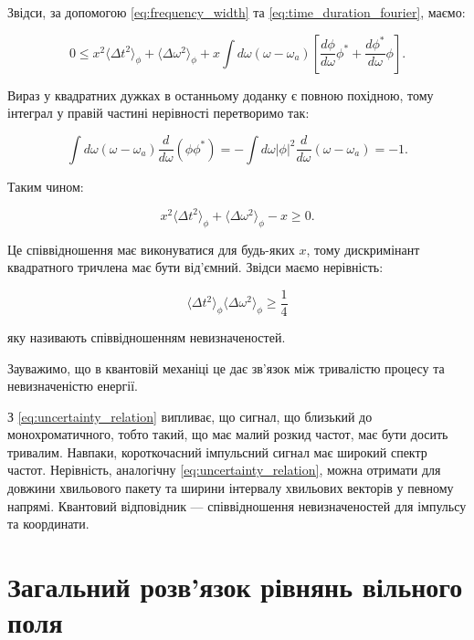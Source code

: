 Звідси, за допомогою \eqref{eq:frequency_width} та \eqref{eq:time_duration_fourier}, маємо:

\begin{equation*}
0 \leq x^2 \langle \Delta t^2 \rangle_{\phi} + \langle \Delta \omega^2 \rangle_{\phi} + x \int d\omega (\omega - \omega_a) \left[ \frac{d\phi}{d\omega}
\phi^{*} + \frac{d\phi^{*}}{d\omega} \phi \right].
\end{equation*}

Вираз у квадратних дужках в останньому доданку є повною похідною, тому інтеграл у правій частині нерівності перетворимо так:

\begin{equation*}
\int d\omega (\omega - \omega_a) \frac{d}{d\omega} (\phi \phi^{*}) = -\int d\omega |\phi|^2 \frac{d}{d\omega} (\omega - \omega_a) = -1.
\end{equation*}

Таким чином:

\begin{equation*}
x^2 \langle \Delta t^2 \rangle_{\phi} + \langle \Delta \omega^2 \rangle_{\phi} - x \geq 0.
\end{equation*}

Це співвідношення має виконуватися для будь-яких \( x \), тому дискримінант квадратного тричлена має бути від’ємний. Звідси маємо нерівність:

\begin{equation}
\langle \Delta t^2 \rangle_{\phi} \langle \Delta \omega^2 \rangle_{\phi} \geq \frac{1}{4}
\label{eq:uncertainty_relation}
\end{equation}

яку називають співвідношенням невизначеностей.

Зауважимо, що в квантовій механіці це дає зв’язок між тривалістю процесу та невизначеністю енергії.

З \eqref{eq:uncertainty_relation} випливає, що сигнал, що близький до монохроматичного, тобто такий, що має малий розкид частот, має бути досить
тривалим. Навпаки, короткочасний імпульсний сигнал має широкий спектр частот. Нерівність, аналогічну \eqref{eq:uncertainty_relation}, можна отримати для
довжини хвильового пакету та ширини інтервалу хвильових векторів у певному напрямі. Квантовий відповідник --- співвідношення невизначеностей для
імпульсу та координати.

\section{Загальний розв’язок рівнянь вільного поля}

